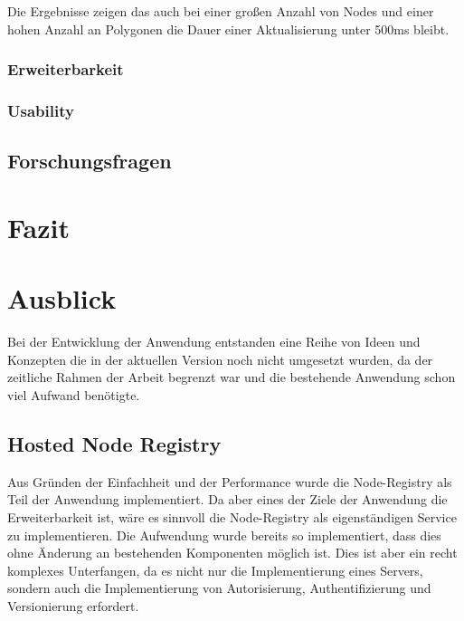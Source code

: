 \documentclass[ngerman]{article}
\begin{document}
Die Ergebnisse zeigen das auch bei einer großen Anzahl von Nodes und einer hohen Anzahl an Polygonen die Dauer einer Aktualisierung unter 500ms bleibt. 

\subsubsection{Erweiterbarkeit}

\subsubsection{Usability}

\subsection{Forschungsfragen}

\section{Fazit}







\section{Ausblick}
Bei der Entwicklung der Anwendung entstanden eine Reihe von Ideen und Konzepten die in der aktuellen Version noch nicht umgesetzt wurden, da 
der zeitliche Rahmen der Arbeit begrenzt war und die bestehende Anwendung schon viel Aufwand benötigte.

\subsection*{Hosted Node Registry}
Aus Gründen der Einfachheit und der Performance wurde die Node-Registry als Teil der Anwendung implementiert. Da aber eines der Ziele der Anwendung die Erweiterbarkeit ist, wäre es sinnvoll die Node-Registry als eigenständigen Service zu implementieren. Die Aufwendung wurde bereits so implementiert, dass dies ohne Änderung an bestehenden Komponenten möglich ist.
\br
Dies ist aber ein recht komplexes Unterfangen, da es nicht nur die Implementierung eines Servers, sondern auch die Implementierung von Autorisierung, Authentifizierung und Versionierung erfordert.
\end{document}
